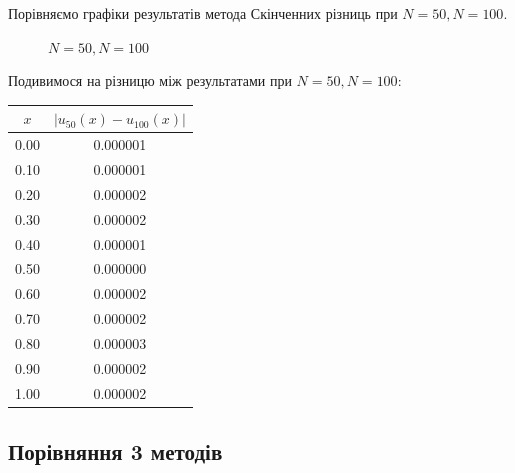 \documentclass[14pt,a4paper]{scrartcl}
\begin{document}
	Порівняємо графіки результатів метода Скінченних різниць при $N= 50, N = 100$.
	
	\begin{figure}[h!]
		\caption{$N=50,N=100$}
		\label{fig:image}
	\end{figure}



	Подивимося на різницю між результатами при $N=50, N=100$:
	
	\begin{center}
		\begin{tabular}{ | c | c | }
			\hline
			$x$ & $|u_{50}(x)-u_{100}(x)|$\\ \hline
			0.00 & 0.000001 \\
			0.10 & 0.000001 \\
			0.20 & 0.000002 \\
			0.30 & 0.000002 \\
			0.40 & 0.000001 \\
			0.50 & 0.000000 \\
			0.60 & 0.000002 \\
			0.70 & 0.000002 \\
			0.80 & 0.000003 \\
			0.90 & 0.000002 \\
			1.00 & 0.000002 \\
			\hline
		\end{tabular}
	\end{center}
		
		
\subsection{Порівняння 3 методів}
\end{document}
